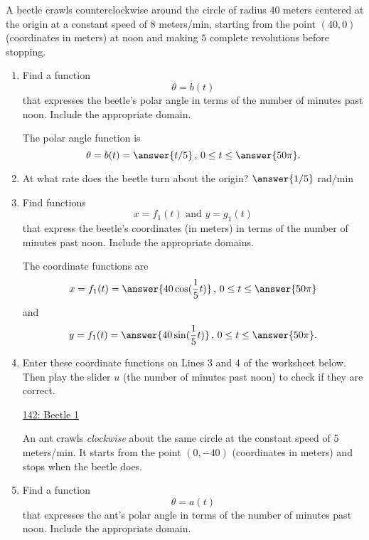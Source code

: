 \documentclass{ximera}
\begin{document}
\begin{example} \label{Edfhg]hghgdfg}
A beetle crawls counterclockwise around the circle of radius $40$ meters centered at the origin at a constant speed of $8$ meters/min, starting from the point $(40,0)$ (coordinates in meters) at noon and making $5$ complete revolutions before stopping.

\begin{enumerate}

\item Find a function
\[
    \theta = b(t)
\]
that expresses the beetle's polar angle in terms of the number of minutes past noon. Include the appropriate domain.

The polar angle function is
\[
   \theta = b(t) = \answer{t/5} \, , \, 0 \leq t \leq \answer{50\pi} .
\]

\item At what rate does the beetle turn about the origin?  $\answer{1/5}$ rad/min



\item Find functions
\[
   x = f_1(t) \text{ and } y=g_1(t)
\]
that express the beetle's coordinates (in meters)  in terms of the number of minutes past noon. Include the appropriate domains.

The coordinate functions are
\[
    x = f_1(t) = \answer{40\cos(\frac{1}{5}t)} \, , \, 0 \leq t \leq \answer{50\pi} 
\]
and 
\[
    y = f_1(t) = \answer{40\sin(\frac{1}{5}t)} \, , \, 0 \leq t \leq \answer{50\pi} .
\]

\item Enter these coordinate functions on Lines 3 and 4 of the worksheet below. Then play the slider $u$ (the number of minutes past noon) to check if they are correct.

\begin{onlineOnly}
    \begin{center}
\end{center}
\end{onlineOnly}

\href{https://www.desmos.com/calculator/yl12y82pd6}{142: Beetle 1}



An ant crawls \emph{clockwise} about the same circle at the constant speed of $5$ meters/min. It starts from the point $(0,-40)$  (coordinates in meters) and stops when the beetle does.

\item Find a function
\[
    \theta = a(t)
\]
that expresses the ant's polar angle in terms of the number of minutes past noon. Include the appropriate domain.


\end{enumerate}
\end{example}
\end{document}
